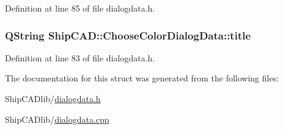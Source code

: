 Definition at line 85 of file dialogdata.\+h.

\subsubsection[{\texorpdfstring{title}{title}}]{\setlength{\rightskip}{0pt plus 5cm}Q\+String Ship\+C\+A\+D\+::\+Choose\+Color\+Dialog\+Data\+::title}\hypertarget{structShipCAD_1_1ChooseColorDialogData_aedfb5ee0ef99d57837d728a477303d0b}{}\label{structShipCAD_1_1ChooseColorDialogData_aedfb5ee0ef99d57837d728a477303d0b}


Definition at line 83 of file dialogdata.\+h.



The documentation for this struct was generated from the following files\+:\begin{DoxyCompactItemize}
\item 
Ship\+C\+A\+Dlib/\hyperlink{dialogdata_8h}{dialogdata.\+h}\item 
Ship\+C\+A\+Dlib/\hyperlink{dialogdata_8cpp}{dialogdata.\+cpp}\end{DoxyCompactItemize}
